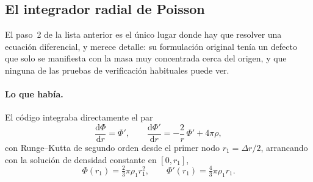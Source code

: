 \documentclass[11pt,a4paper]{article}
\newcommand{\dd}{\mathrm{d}}
\begin{document}
\subsection{El integrador radial de Poisson}
\label{sec:poisson}

El paso~2 de la lista anterior es el único lugar donde hay que resolver una ecuación
diferencial, y merece detalle: su formulación original tenía un defecto que solo se
manifiesta con la masa muy concentrada cerca del origen, y que ninguna de las pruebas
de verificación habituales puede ver.

\paragraph{Lo que había.} El código integraba directamente el par
\begin{equation}
  \frac{\dd \Phi}{\dd r}=\Phi',\qquad
  \frac{\dd \Phi'}{\dd r}=-\frac{2}{r}\,\Phi'+4\pi\rho ,
  \label{eq:poisson_ode}
\end{equation}
con Runge--Kutta de segundo orden desde el primer nodo $r_1=\Delta r/2$, arrancando con
la solución de densidad constante en $[0,r_1]$,
\begin{equation}
  \Phi(r_1)=\tfrac23\pi\rho_1r_1^2,\qquad \Phi'(r_1)=\tfrac43\pi\rho_1r_1 .
  \label{eq:arranque}
\end{equation}
\end{document}

